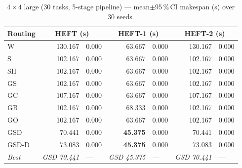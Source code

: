 \documentclass[11pt]{article}
\newcommand{\win}[1]{\textcolor{green!50!black}{\textbf{#1}}}
\newcommand{\bad}[1]{\textcolor{red!70!black}{#1}}
\begin{document}
\begin{table}[H]\centering\small
\begin{tabular}{l r@{$\pm$}l r@{$\pm$}l r@{$\pm$}l}
\toprule
\textbf{Routing} & \multicolumn{2}{c}{\textbf{HEFT (s)}} & \multicolumn{2}{c}{\textbf{HEFT-1 (s)}} & \multicolumn{2}{c}{\textbf{HEFT-2 (s)}} \\
\midrule
  W & \bad{130.167} & 0.000 & 63.667 & 0.000 & \bad{130.167} & 0.000 \\
  S & 102.167 & 0.000 & 63.667 & 0.000 & 102.167 & 0.000 \\
  SH & 102.167 & 0.000 & 63.667 & 0.000 & 102.167 & 0.000 \\
  GS & 102.167 & 0.000 & 63.667 & 0.000 & 102.167 & 0.000 \\
  GC & 107.167 & 0.000 & 63.667 & 0.000 & 107.167 & 0.000 \\
  GB & 102.167 & 0.000 & \bad{68.333} & 0.000 & 102.167 & 0.000 \\
  GO & 102.167 & 0.000 & 63.667 & 0.000 & 102.167 & 0.000 \\
  GSD & 70.441 & 0.000 & \win{45.375} & 0.000 & 70.441 & 0.000 \\
  GSD-D & 73.083 & 0.000 & \win{45.375} & 0.000 & 73.083 & 0.000 \\
\midrule
  \textit{Best} & \textit{GSD 70.441} & --- & \textit{GSD 45.375} & --- & \textit{GSD 70.441} & --- \\
\bottomrule\end{tabular}
\caption{$4\times4$ large (30 tasks, 5-stage pipeline) --- mean$\pm$95\,\%\,CI makespan (s) over 30 seeds.}
\end{table}
\end{document}
